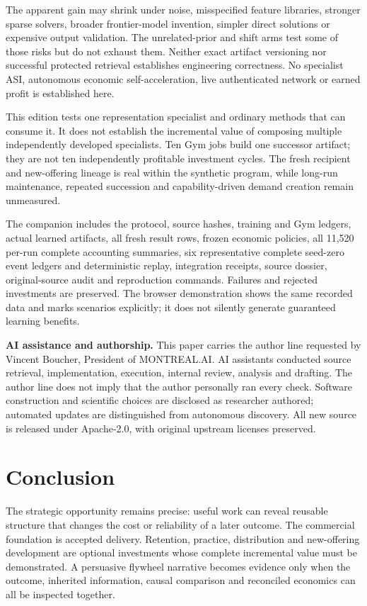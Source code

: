 \documentclass[11pt,letterpaper]{article}
\begin{document}
The apparent gain may shrink under noise, misspecified feature libraries, stronger sparse solvers, broader frontier-model invention, simpler direct solutions or expensive output validation. The unrelated-prior and shift arms test some of those risks but do not exhaust them. Neither exact artifact versioning nor successful protected retrieval establishes engineering correctness. No specialist ASI, autonomous economic self-acceleration, live authenticated network or earned profit is established here.

This edition tests one representation specialist and ordinary methods that can consume it. It does not establish the incremental value of composing multiple independently developed specialists. Ten Gym jobs build one successor artifact; they are not ten independently profitable investment cycles. The fresh recipient and new-offering lineage is real within the synthetic program, while long-run maintenance, repeated succession and capability-driven demand creation remain unmeasured.

The companion includes the protocol, source hashes, training and Gym ledgers, actual learned artifacts, all fresh result rows, frozen economic policies, all 11,520 per-run complete accounting summaries, six representative complete seed-zero event ledgers and deterministic replay, integration receipts, source dossier, original-source audit and reproduction commands. Failures and rejected investments are preserved. The browser demonstration shows the same recorded data and marks scenarios explicitly; it does not silently generate guaranteed learning benefits.

\textbf{AI assistance and authorship.} This paper carries the author line requested by Vincent Boucher, President of MONTREAL.AI. AI assistants conducted source retrieval, implementation, execution, internal review, analysis and drafting. The author line does not imply that the author personally ran every check. Software construction and scientific choices are disclosed as researcher authored; automated updates are distinguished from autonomous discovery. All new source is released under Apache-2.0, with original upstream licenses preserved.

\section{Conclusion}



The strategic opportunity remains precise: useful work can reveal reusable structure that changes the cost or reliability of a later outcome. The commercial foundation is accepted delivery. Retention, practice, distribution and new-offering development are optional investments whose complete incremental value must be demonstrated. A persuasive flywheel narrative becomes evidence only when the outcome, inherited information, causal comparison and reconciled economics can all be inspected together.
\end{document}
